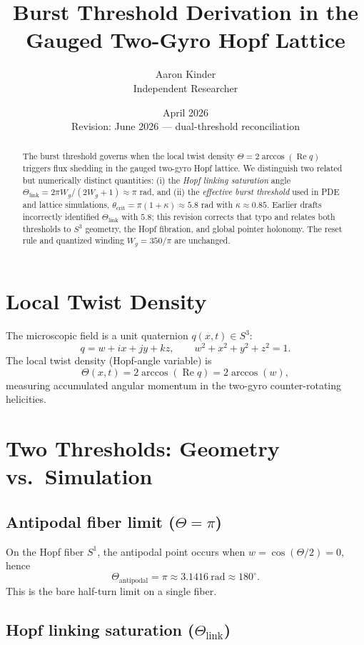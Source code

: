 \documentclass[11pt]{article}
\title{Burst Threshold Derivation in the Gauged Two-Gyro Hopf Lattice}
\author{Aaron Kinder \\ Independent Researcher}
\date{April 2026 \\ \small Revision: June 2026 --- dual-threshold reconciliation}
\begin{document}
\maketitle

\begin{abstract}
The burst threshold governs when the local twist density $\Theta = 2\arccos(\operatorname{Re} q)$
triggers flux shedding in the gauged two-gyro Hopf lattice. We distinguish two related but numerically
distinct quantities: (i) the \emph{Hopf linking saturation} angle
$\Theta_{\mathrm{link}} = 2\pi W_g/(2W_g+1) \approx \pi$ rad, and (ii) the \emph{effective burst
threshold} used in PDE and lattice simulations,
$\theta_{\mathrm{crit}} = \pi(1+\kappa) \approx 5.8$ rad with $\kappa \approx 0.85$.
Earlier drafts incorrectly identified $\Theta_{\mathrm{link}}$ with $5.8$; this revision corrects
that typo and relates both thresholds to $S^3$ geometry, the Hopf fibration, and global pointer
holonomy. The reset rule and quantized winding $W_g = 350/\pi$ are unchanged.
\end{abstract}

\section{Local Twist Density}

The microscopic field is a unit quaternion $q(x,t) \in S^3$:
\[
q = w + ix + jy + kz, \qquad w^2+x^2+y^2+z^2 = 1.
\]
The local twist density (Hopf-angle variable) is
\[
\Theta(x,t) = 2\arccos(\operatorname{Re} q) = 2\arccos(w),
\]
measuring accumulated angular momentum in the two-gyro counter-rotating helicities.

\section{Two Thresholds: Geometry vs.\ Simulation}

\subsection{Antipodal fiber limit ($\Theta = \pi$)}

On the Hopf fiber $S^1$, the antipodal point occurs when $w = \cos(\Theta/2) = 0$, hence
\[
\Theta_{\mathrm{antipodal}} = \pi \approx 3.1416~\mathrm{rad} \approx 180^\circ.
\]
This is the bare half-turn limit on a single fiber.

\subsection{Hopf linking saturation ($\Theta_{\mathrm{link}}$)}
\end{document}
